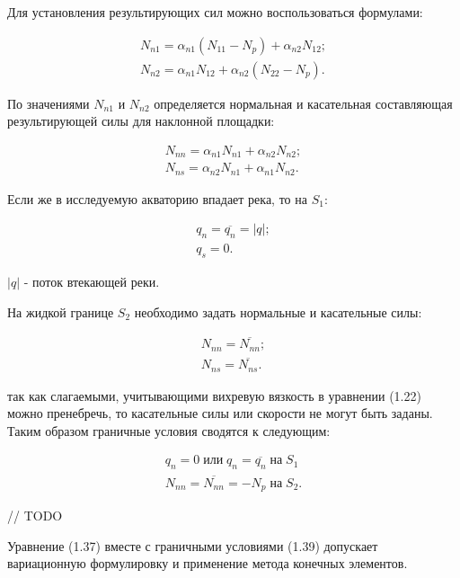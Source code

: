 \documentclass[14pt]{extreport}
\begin{document}
Для установления результирующих сил можно воспользоваться формулами:

\begin{eqnarray}
N_{n1}=\alpha_{n1}(N_{11}-N_{p})+\alpha_{n2}N_{12}; \nonumber\\
N_{n2}=\alpha_{n1}N_{12}+\alpha_{n2}(N_{22}-N_{p}).
\end{eqnarray}

По значениями $N_{n1}$ и $N_{n2}$ определяется нормальная и касательная составляющая результирующей силы для наклонной площадки:

\begin{eqnarray}
N_{nn}=\alpha_{n1}N_{n1}+\alpha_{n2}N_{n2}; \nonumber\\
N_{ns}=\alpha_{n2}N_{n1}+\alpha_{n1}N_{n2}.
\end{eqnarray}

Если же в исследуемую акваторию впадает река, то на $ S_1 $:

\begin{eqnarray}
q_n=\overline{q_n}=|q|; \nonumber\\
q_s=0.
\end{eqnarray}

 $|q|$ - поток втекающей
реки. 

На жидкой границе $ S_2 $ необходимо задать нормальные и касательные силы:

\begin{eqnarray}
N_{nn}=\overline{N_{nn}}; \nonumber\\
N_{ns}=\overline{N_{ns}}.
\end{eqnarray}

 так как слагаемыми, учитывающими вихревую вязкость в уравнении (1.22) можно пренебречь, то касательные силы или скорости не могут быть заданы. Таким образом граничные условия сводятся к следующим:

\begin{eqnarray}
q_n=0 \; \text{или} \; q_n=\overline{q_n} \; \text{на} \; S_1\nonumber\\
N_{nn}=\overline{N_{nn}}=-N_p \; \text{на} \; S_2.
\end{eqnarray}


// TODO

Уравнение (1.37) вместе с граничными условиями (1.39) допускает вариационную формулировку и применение метода конечных элементов.
\end{document}
